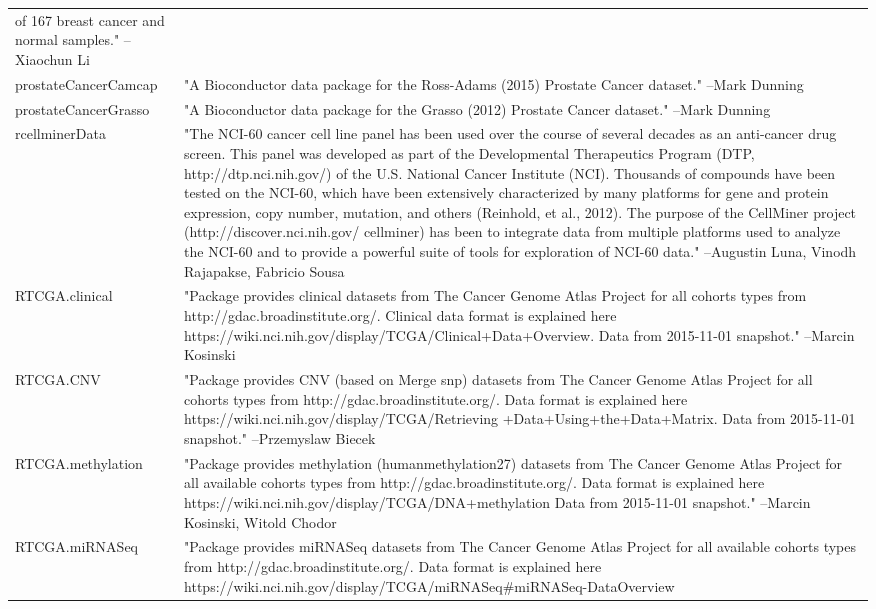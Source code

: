 \documentclass[]{article}
\begin{document}
\begin{longtable}[t]{l>{\raggedright\arraybackslash}p{25em}}
of 167 breast cancer and normal samples." --Xiaochun Li\\
\addlinespace
prostateCancerCamcap & "A Bioconductor data package for the Ross-Adams (2015)
Prostate Cancer dataset." --Mark Dunning\\
prostateCancerGrasso & "A Bioconductor data package for the Grasso (2012) Prostate
Cancer dataset." --Mark Dunning\\
rcellminerData & "The NCI-60 cancer cell line panel has been used over the
course of several decades as an anti-cancer drug screen. This
panel was developed as part of the Developmental Therapeutics
Program (DTP, http://dtp.nci.nih.gov/) of the U.S. National
Cancer Institute (NCI). Thousands of compounds have been tested
on the NCI-60, which have been extensively characterized by
many platforms for gene and protein expression, copy number,
mutation, and others (Reinhold, et al., 2012). The purpose of
the CellMiner project (http://discover.nci.nih.gov/ cellminer)
has been to integrate data from multiple platforms used to
analyze the NCI-60 and to provide a powerful suite of tools for
exploration of NCI-60 data." --Augustin Luna, Vinodh Rajapakse, Fabricio Sousa\\
RTCGA.clinical & "Package provides clinical datasets from The Cancer Genome
Atlas Project for all cohorts types from
http://gdac.broadinstitute.org/. Clinical data format is
explained here
https://wiki.nci.nih.gov/display/TCGA/Clinical+Data+Overview.
Data from 2015-11-01 snapshot." --Marcin Kosinski\\
RTCGA.CNV & "Package provides CNV (based on Merge snp) datasets from
The Cancer Genome Atlas Project for all cohorts types from
http://gdac.broadinstitute.org/. Data format is explained here
https://wiki.nci.nih.gov/display/TCGA/Retrieving
+Data+Using+the+Data+Matrix. Data from 2015-11-01 snapshot." --Przemyslaw Biecek\\
\addlinespace
RTCGA.methylation & "Package provides methylation (humanmethylation27) datasets
from The Cancer Genome Atlas Project for all available cohorts
types from http://gdac.broadinstitute.org/. Data format is
explained here
https://wiki.nci.nih.gov/display/TCGA/DNA+methylation Data from
2015-11-01 snapshot." --Marcin Kosinski, Witold Chodor\\
RTCGA.miRNASeq & "Package provides miRNASeq datasets from The Cancer Genome
Atlas Project for all available cohorts types from
http://gdac.broadinstitute.org/. Data format is explained here
https://wiki.nci.nih.gov/display/TCGA/miRNASeq\#miRNASeq-DataOverview

\end{longtable}
\end{document}
